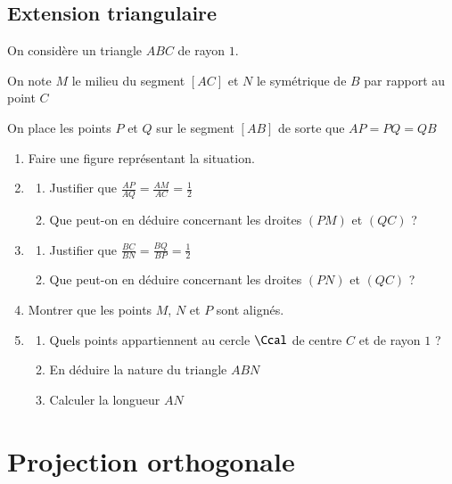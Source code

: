\documentclass[oneside,12pt]{article}          %
\begin{document}
\subsection{Extension triangulaire}
On considère un triangle $ABC$ de rayon $1$. 

On note $M$ le milieu du segment $[AC]$ et $N$ le symétrique de $B$ par rapport au point $C$ 

On place les points $P$ et $Q$ sur le segment $[AB]$ de sorte que $AP=PQ=QB$
\begin{enumerate}
	\item Faire une figure représentant la situation.
	\item \begin{enumerate}
		\item Justifier que $\frac{AP}{AQ}=\frac{AM}{AC}=\frac{1}{2}$
		\item Que peut-on en déduire concernant les droites $(PM)$ et $(QC)$ ?
	\end{enumerate}
	\item \begin{enumerate}
		\item Justifier que $\frac{BC}{BN}=\frac{BQ}{BP}=\frac{1}{2}$
		\item Que peut-on en déduire concernant les droites $(PN)$ et $(QC)$ ?
	\end{enumerate}
	\item Montrer que les points $M$, $N$ et $P$ sont alignés.
	\item \begin{enumerate}
		\item Quels points appartiennent au cercle $\Ccal$ de centre $C$ et de rayon $1$ ?
		\item En déduire la nature du triangle $ABN$
		\item Calculer la longueur $AN$
	\end{enumerate}
\end{enumerate}



\newpage



\section{Projection orthogonale}
\end{document}
